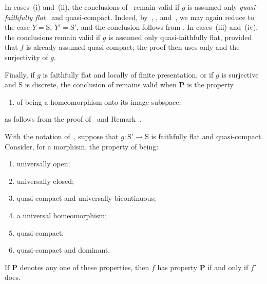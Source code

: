 \begin{remark}[2.6.3]
\label{IV.2.6.3}
In cases~(i) and~(ii), the conclusions of~ remain valid
if $g$ is assumed only \emph{quasi-faithfully flat}~
and quasi-compact. Indeed, by~, ,
and~, we may again reduce to the case
$Y=\mathrm{S}$, $Y'=\mathrm{S}'$, and the conclusion follows from
. In cases~(iii) and~(iv), the conclusions remain valid
if $g$ is assumed only quasi-faithfully flat, provided that $f$ is
already assumed quasi-compact; the proof then uses only
 and the surjectivity of $g$.

Finally, if $g$ is faithfully flat and locally of finite presentation,
or if $g$ is surjective and $\mathrm{S}$ is discrete, the conclusion of
 remains valid when $\mathbf{P}$ is the property
\begin{enumerate}
  \item[(iii \emph{bis})] of being a homeomorphism onto its image
    subspace;
\end{enumerate}
as follows from the proof of~ and
Remark~.
\end{remark}

\begin{corollary}[2.6.4]
\label{IV.2.6.4}
With the notation of~, suppose that
$g:\mathrm{S}'\to\mathrm{S}$ is faithfully flat and quasi-compact.
Consider, for a morphism, the property of being:
\begin{enumerate}
  \item[(i)] universally open;
  \item[(ii)] universally closed;
  \item[(iii)] quasi-compact and universally bicontinuous;
  \item[(iv)] a universal homeomorphism;
  \item[(v)] quasi-compact;
  \item[(vi)] quasi-compact and dominant.
\end{enumerate}
If $\mathbf{P}$ denotes any one of these properties, then $f$ has
property $\mathbf{P}$ if and only if $f'$ does.
\end{corollary}

